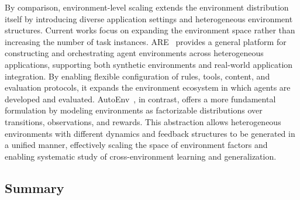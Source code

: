 \documentclass{llmxive}
\begin{document}
By comparison, environment-level scaling extends the environment distribution itself by introducing diverse application settings and heterogeneous environment structures.
%
Current works focus on expanding the environment space rather than increasing the number of task instances.
%
ARE~\cite{ARE} provides a general platform for constructing and orchestrating agent environments across heterogeneous applications, supporting both synthetic environments and real-world application integration.
By enabling flexible configuration of rules, tools, content, and evaluation protocols, it expands the environment ecosystem in which agents are developed and evaluated.
%
AutoEnv~\cite{AutoEnv}, in contrast, offers a more fundamental formulation by modeling environments as factorizable distributions over transitions, observations, and rewards.
This abstraction allows heterogeneous environments with different dynamics and feedback structures to be generated in a unified manner, effectively scaling the space of environment factors and enabling systematic study of cross-environment learning and generalization.
%
%
\subsection{Summary}

\end{document}
